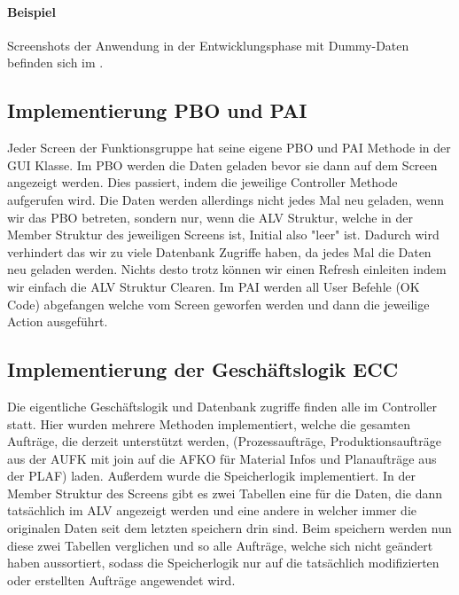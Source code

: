 \paragraph{Beispiel}
Screenshots der Anwendung in der Entwicklungsphase mit Dummy-Daten befinden sich im .

\subsection{Implementierung PBO und PAI}
\label{sec:Implementierung PBO und PAI}
Jeder Screen der Funktionsgruppe hat seine eigene \ac{PBO} und \ac{PAI} Methode in der GUI Klasse. Im PBO werden die Daten geladen bevor sie dann auf dem Screen angezeigt werden. Dies passiert, indem die jeweilige Controller Methode aufgerufen wird. Die Daten werden allerdings nicht jedes Mal neu geladen, wenn wir das \ac{PBO} betreten, sondern nur, wenn die ALV Struktur, welche in der Member Struktur des jeweiligen Screens ist, Initial also "leer" ist. Dadurch wird verhindert das wir zu viele Datenbank Zugriffe haben, da jedes Mal die Daten neu geladen werden. Nichts desto trotz können wir einen Refresh einleiten indem wir einfach die \ac{ALV} Struktur Clearen. Im \ac{PAI} werden all User Befehle (OK Code) abgefangen welche vom Screen geworfen werden und dann die jeweilige Action ausgeführt. 

\subsection{Implementierung der Geschäftslogik ECC}
\label{sec:Implementierung der Geschäftslogik ECC}
Die eigentliche Geschäftslogik und Datenbank zugriffe finden alle im Controller statt. Hier wurden mehrere Methoden implementiert, welche die gesamten Aufträge, die derzeit unterstützt werden, (Prozessaufträge, Produktionsaufträge aus der AUFK mit join auf die AFKO für Material Infos und Planaufträge aus der PLAF) laden. Außerdem wurde die Speicherlogik implementiert. In der Member Struktur des Screens gibt es zwei Tabellen eine für die Daten, die dann tatsächlich im \ac{ALV} angezeigt werden und eine andere in welcher immer die originalen Daten seit dem letzten speichern drin sind. Beim speichern werden nun diese zwei Tabellen verglichen und so alle Aufträge, welche sich nicht geändert haben aussortiert, sodass die Speicherlogik nur auf die tatsächlich modifizierten oder erstellten Aufträge angewendet wird.   

